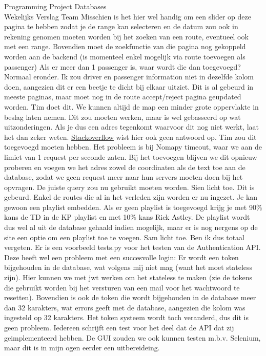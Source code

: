 \documentclass{article}
\newcounter{team}
\begin{document}
\begin{Minutes}{Programming Project Databases \\ Wekelijks Verslag Team }
				    Misschien is het hier wel handig om een slider op deze pagina te hebben zodat je de range kan selecteren en de datum zou ook in rekening genomen moeten worden bij het zoeken van een route, eventueel ook met een range. Bovendien moet de zoekfunctie van die pagina nog gekoppeld worden aan de backend (is momenteel enkel mogelijk via route toevoegen als passenger)
				    Als er meer dan 1 passenger is, waar wordt die dan toegevoegd? Normaal eronder. Ik zou driver en passenger information niet in dezelfde kolom doen, aangezien dit er een beetje te dicht bij elkaar uitziet. Dit is al gebeurd in meeste paginas, maar moet nog in de route accept/reject pagina geupdated worden. Tim doet dit. We kunnen altijd de map een minder grote oppervlakte in beslag laten nemen.
				    Dit zou moeten werken, maar is wel gebasseerd op wat uitzonderingen. Als je dus een adres tegenkomt waarvoor dit nog niet werkt, laat het dan zeker weten. \href{https://stackoverflow.com/questions/60994091/is-there-a-way-to-convert-a-geopy-location-to-a-short-address-string}{Stackoverflow} wist hier ook geen antwoord op.
				    Tim zou dit toegevoegd moeten hebben. Het probleem is bij Nomapy timeout, waar we aan de limiet van 1 request per seconde zaten. Bij het toevoegen blijven we dit opnieuw proberen en voegen we het adres zowel de coordinaten als de text toe aan de database, zodat we geen request meer naar hun servers moeten doen bij het opvragen.
				    De juiste query zou nu gebruikt moeten worden. Sien licht toe. Dit is gebeurd. Enkel de routes die al in het verleden zijn worden er nu ingezet.
				    Je kan gewoon een playlist embedden. Als er geen playlist is toegevoegd krijg je met 90\% kans de TD in de KP playlist {\tiny en met 10\% kans Rick Astley}. De playlist wordt dus wel al uit de database gehaald indien mogelijk, maar er is nog nergens op de site een optie om een playlist toe te voegen.
				    Sam licht toe. Ben ik dus totaal vergeten.
				    Er is een voorbeeld tests.py voor het testen van de Authentication API. Deze heeft wel een probleem met een succesvolle login: Er wordt een token bijgehouden in de database, wat volgens mij niet mag (want het moet stateless zijn). Hier kunnen we met jwt werken om het stateless te maken (zie de tokens die gebruikt worden bij het versturen van een mail voor het wachtwoord te resetten). Bovendien is ook de token die wordt bijgehouden in de database meer dan 32 karakters, wat errors geeft met de database, aangezien die kolom was ingesteld op 32 karakters. Het token systeem wordt toch veranderd, dus dit is geen probleem. Iedereen schrijft een test voor het deel dat de API dat zij geimplementeerd hebben. De GUI zouden we ook kunnen testen m.b.v. Selenium, maar dit is in mijn ogen eerder een uitbereideing.

\end{Minutes}
\end{document}
